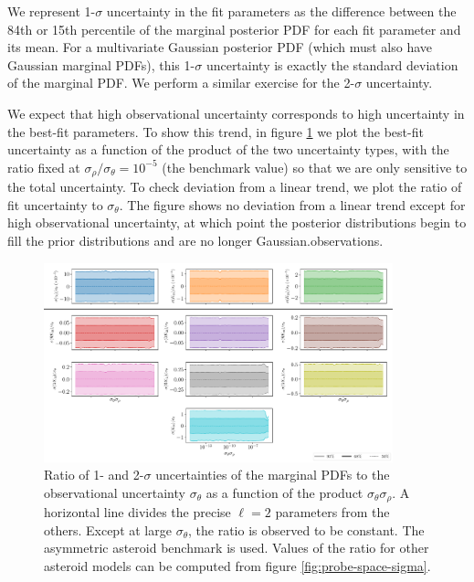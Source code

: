 \documentclass{aastex631}
\begin{document}
We represent 1-$\sigma$ uncertainty in the fit parameters as the difference between the 84th or 15th percentile of the marginal posterior PDF for each fit parameter and its mean. For a multivariate Gaussian posterior PDF (which must also have Gaussian marginal PDFs), this 1-$\sigma$ uncertainty is exactly the standard deviation of the marginal PDF. We perform a similar exercise for the 2-$\sigma$ uncertainty.

We expect that high observational uncertainty corresponds to high uncertainty in the best-fit parameters. To show this trend, in figure \ref{fig:probe-sigma-product} we plot the best-fit uncertainty as a function of the product of the two uncertainty types, with the ratio fixed at $\sigma_\rho / \sigma_\theta = 10^{-5}$ (the benchmark value) so that we are only sensitive to the total uncertainty. To check deviation from a linear trend, we plot the ratio of fit uncertainty to $\sigma_\theta$. The figure shows no deviation from a linear trend except for high observational uncertainty, at which point the posterior distributions begin to fill the prior distributions and are no longer Gaussian.observations.

\begin{figure}
  \centering
  \includegraphics[width=0.9\textwidth]{sigma-products.pdf}
  \caption{Ratio of 1- and 2-$\sigma$ uncertainties of the marginal PDFs to the observational uncertainty $\sigma_\theta$ as a function of the product $\sigma_\theta\sigma_\rho$. A horizontal line divides the precise $\ell=2$ parameters from the others. Except at large $\sigma_\theta$, the ratio is observed to be constant. The asymmetric asteroid benchmark is used. Values of the ratio for other asteroid models can be computed from figure \ref{fig:probe-space-sigma}.}
  \label{fig:probe-sigma-product}
\end{figure}
\end{document}

